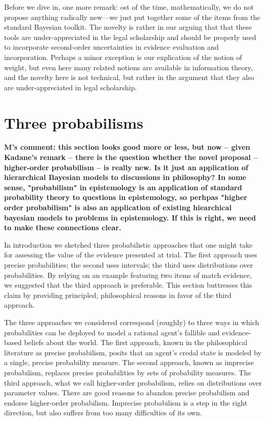 \documentclass[
  10pt,
  dvipsnames,enabledeprecatedfontcommands]{scrartcl}
\begin{document}
Before we dive in, one more remark: ost of the time, mathematically, we
do not propose anything radically new---we just put together some of the
items from the standard Bayesian toolkit. The novelty is rather in our
arguing that that these tools are under-appreciated in the legal
scholarship and should be properly used to incorporate second-order
uncertainties in evidence evaluation and incorporation. Perhaps a minor
exception is our explication of the notion of weight, but even here many
related notions are available in information theory, and the novelty
here is not technical, but rather in the argument that they also are
under-appreciated in legal scholarship.

\hypertarget{three-probabilisms}{%
\section{Three probabilisms}\label{three-probabilisms}}

\label{sec:three-probabilism}


\textbf{M's comment: this section looks good more or less, but now -- given Kadane's remark -- there is the question whether the novel proposal -- higher-order probabilism -- is really new. Is it just an application of hierarchical Bayesian models to discussions in philosophy? In some sense, "probabilism" in epistemology is an application of standard probability theory to questions in epistemology, so perhpas "higher order probabilism" is also an application of existing hiearchical bayesian models to problems in epistemology. If this is right, we need to make these connections clear. }

In introduction we sketched three probabilistic approaches that one
might take for assessing the value of the evidence presented at trial.
The first approach uses precise probabilities; the second uses
intervals; the third uses distributions over probabilities. By relying
on an example featuring two items of match evidence, we suggested that
the third approach is preferable. This section buttresses this claim by
providing principled, philosophical reasons in favor of the third
approach.

The three approaches we considered correspond (roughly) to three ways in
which probabilities can be deployed to model a rational agent's fallible
and evidence-based beliefs about the world. The first approach, known in
the philosophical literature as precise probabilism, posits that an
agent's credal state is modeled by a single, precise probability
measure. The second approach, known as imprecise probabilism, replaces
precise probabilities by sets of probability measures. The third
approach, what we call higher-order probabilism, relies on distributions
over parameter values. There are good reasons to abandon precise
probabilism and endorse higher-order probabilism. Imprecise probabilism
is a step in the right direction, but also suffers from too many
difficulties of its own.
\end{document}
